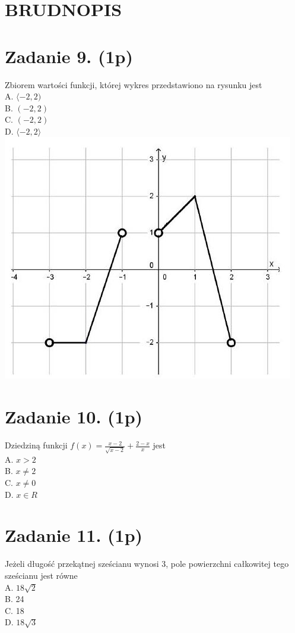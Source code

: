 \documentclass[10pt]{article}
\begin{document}
\section*{BRUDNOPIS}
\section*{Zadanie 9. (1p)}
Zbiorem wartości funkcji, której wykres przedstawiono na rysunku jest\\
A. \(\langle-2,2)\)\\
B. \((-2,2)\)\\
C. \((-2,2)\)\\
D. \(\langle-2,2\rangle\)\\
\includegraphics[max width=\textwidth, center]{2024_11_21_9d761ca624f0efee99a4g-04(1)}

\section*{Zadanie 10. (1p)}
Dziedziną funkcji \(f(x)=\frac{x-2}{\sqrt{x-2}}+\frac{2-x}{x}\) jest\\
A. \(x>2\)\\
B. \(x \neq 2\)\\
C. \(x \neq 0\)\\
D. \(x \in R\)

\section*{Zadanie 11. (1p)}
Jeżeli długość przekątnej sześcianu wynosi 3, pole powierzchni całkowitej tego sześcianu jest równe\\
A. \(18 \sqrt{2}\)\\
B. 24\\
C. 18\\
D. \(18 \sqrt{3}\)
\end{document}
